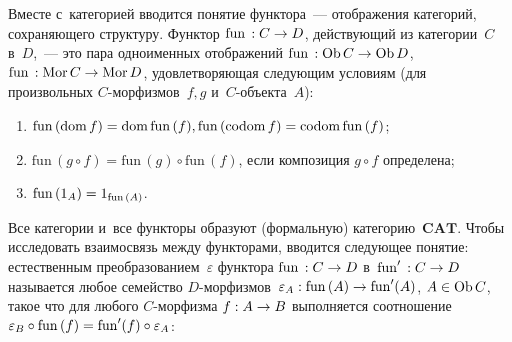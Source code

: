 \begin{multicols}{2}
   Вместе с~категорией вводится понятие функтора~--- отображения категорий, 
сохраняющего структуру. Функтор $\mathrm{fun}\,: C \hm\to D$, действующий из 
категории~$C$ в~$D$,~--- это пара одноименных отображений $\mathrm{fun}\,: 
\mathrm{Ob}\,C \hm\to \mathrm{Ob}\,D$, $\mathrm{fun}\,: \mathrm{Mor}\,C \hm\to 
\mathrm{Mor}\,D$, удовлетворяющая следующим условиям (для произвольных 
$C$-мор\-физ\-мов~$f, g$ и~$C$-объ\-ек\-та~$A$): 
\begin{enumerate}[(1)]
\item $\mathrm{fun}\,(\mathrm{dom}\,f) 
\hm= \mathrm{dom}\,\mathrm{fun}\,(f), \mathrm{fun}\,(\mathrm{codom}\,f)\hm = 
\mathrm{codom}\,\mathrm{fun}\,(f)$;  
\item $\mathrm{fun}\,(g \circ f) = \mathrm{fun}\,(g) \circ \mathrm{fun}\,(f)$, 
если композиция $g \circ f$ определена; 
\item $\mathrm{fun}\,(1_A) \hm= 1_{\mathrm{fun}\,(A)}$.
\end{enumerate}
 Все категории и~все функторы образуют 
(формальную) категорию~$\mathbf{CAT}$. Чтобы исследовать взаимосвязь 
между функторами, вводится следующее понятие: естественным 
преобразованием~$\varepsilon$ функтора $\mathrm{fun}\, : C\hm\to D$ в~$\mathrm{fun}^\prime\, : C 
\hm\to D$ называется любое семейство $D$-мор\-физ\-мов~$\varepsilon_A : 
\mathrm{fun}\,(A) \hm\to \mathrm{fun}^\prime (A)$, $A \hm\in \mathrm{Ob}\,C$, 
такое что для любого 
\mbox{$C$-мор}\-физ\-ма $f : A\hm\to B$ выполняется соотношение $\varepsilon_B \circ 
\mathrm{fun}\,(f) \hm= \mathrm{fun}^\prime(f) \circ \varepsilon_A$:

\vspace*{1pt}
\begin{center}
\mbox{%
\epsfxsize=54.473mm
}
\end{center}


\end{multicols}
